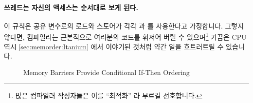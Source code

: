 \paragraph{쓰레드는 자신의 액세스는 순서대로 보게 된다.}
이 규칙은 공유 변수로의 로드와 스토어가 각각  과
 를 사용한다고 가정합니다.
그렇지 않다면, 컴파일러는 근본적으로 여러분의 코드를 휘저어 버릴 수
있으며\footnote{
	많은 컴파일러 작성자들은 이를 ``최적화'' 라 부르길 선호합니다.}
가끔은 CPU 역시 \cref{sec:memorder:Itanium} 에서 이야기된 것처럼 약간 일을
흐트러트릴 수 있습니다.

\begin{figure}[tb]
\centering
{}
\caption{Memory Barriers Provide Conditional If-Then Ordering}
\label{fig:memorder:Memory Barriers Provide Conditional If-Then Ordering}
\end{figure}

